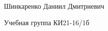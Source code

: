 Шинкаренко Даниил Дмитриевич
\begin{DoxyItemize}
\item Учебная группа КИ21-\/16/1б 
\end{DoxyItemize}